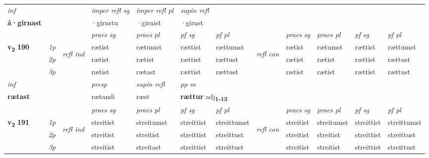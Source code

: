 \begin{longtable}[l]{X>{\footnotesize\itshape}llXXXXlXXXX}
   {\textit{inf}} & &   & \textit{imper refl sg} & \textit{imper refl pl}   & \textit{supin refl}  \\*
  {\textbf{á\allowbreak ·girnast}} & &   & ·girnstu & ·girnist   & ·girnst  \\*

\midrule

 & &   & \textit{praes sg}  & \textit{praes pl}    & \textit{ pf sg} & \textit{pf pl} & & \textit{praes sg}  & \textit{praes pl}    & \textit{pf sg} & \textit{pf pl }  \\ \cmidrule{4-7} \cmidrule{9-12}
 \multirow{2}{*}{{{\textbf{v{\textsubscript{2}}} \Large{\textbf{190}}}}}  & 1p & \multirow{3}{*}{\begin{turn}{90}\textit{refl ind}\end{turn}}  & rætist & rætumst & rættist & rættumst & \multirow{3}{*}{\begin{turn}{90}\textit{refl con}\end{turn}}  &rætist & rætumst & rættist & rættumst \\*
 & 2p &  & rætist & rætist & rættist & rættust & &rætist & rætist & rættist & rættust \\*
 & 3p  & & rætist & rætast & rættist & rættust & & rætist & rætist& rættist & rættust \\*
\cmidrule{4-7} \cmidrule{9-12}

   {\textit{inf}} & &     & \textit{presp}  & \textit{supin refl} & \textit{pp m} \\*
  {\textbf{rætast}} & &     & rætandi  & ræst & \multicolumn{2}{l}{\textbf{rættur} adj\textbf{\textsubscript{1-13}}} \\*

\midrule

 & &   & \textit{praes sg}  & \textit{praes pl}    & \textit{ pf sg} & \textit{pf pl} & & \textit{praes sg}  & \textit{praes pl}    & \textit{pf sg} & \textit{pf pl }  \\ \cmidrule{4-7} \cmidrule{9-12}
 \multirow{2}{*}{{{\textbf{v{\textsubscript{2}}} \Large{\textbf{191}}}}}  & 1p & \multirow{3}{*}{\begin{turn}{90}\textit{refl ind}\end{turn}}  & streitist & streitumst & streittist & streittumst & \multirow{3}{*}{\begin{turn}{90}\textit{refl con}\end{turn}}  &streitist & streitumst & streittist & streittumst \\*
 & 2p &  & streitist & streitist & streittist & streittust & &streitist & streitist & streittist & streittust \\*
 & 3p  & & streitist & streitast & streittist & streittust & & streitist & streitist& streittist & streittust \\*
\cmidrule{4-7} \cmidrule{9-12}


\end{longtable}
